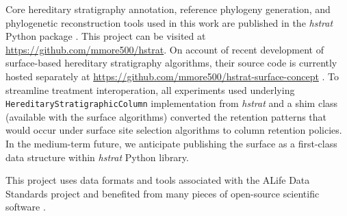 Core hereditary stratigraphy annotation, reference phylogeny generation, and phylogenetic reconstruction tools used in this work are published in the \textit{hstrat} Python package \citep{moreno2022hstrat}.
This project can be visited at \url{https://github.com/mmore500/hstrat}.
On account of recent development of surface-based hereditary stratigraphy algorithms, their source code is currently hosted separately at \url{https://github.com/mmore500/hstrat-surface-concept} \citep{moreno2024hsurf}.
To streamline treatment interoperation, all experiments used underlying \texttt{HereditaryStratigraphicColumn} implementation from \textit{hstrat} and a shim class (available with the surface algorithms) converted the retention patterns that would occur under surface site selection algorithms to column retention policies.
In the medium-term future, we anticipate publishing the surface as a first-class data structure within \textit{hstrat} Python library.

This project uses data formats and tools associated with the ALife Data Standards project \citep{lalejini2019data} and benefited from many pieces of open-source scientific software \citep{sand2014tqdist,2020SciPy-NMeth,harris2020array,reback2020pandas,mckinney-proc-scipy-2010,sukumaran2010dendropy,cock2009biopython,torchiano2016effsize,waskom2021seaborn,hunter2007matplotlib,moreno2024apc,moreno2024qspool,moreno2023teeplot,hagen2021gen3sis,torchiano2016effsize}.
